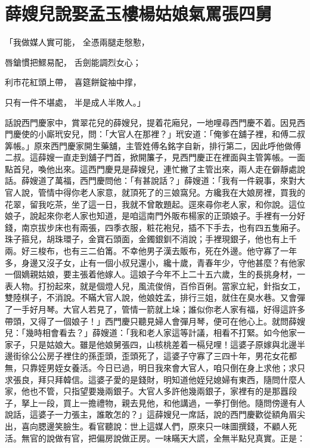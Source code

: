 %

\chapter{薛嫂兒說娶孟玉樓\KG 楊姑娘氣罵張四舅}

\begin{showcontents}{}



「我做媒人實可能，  全憑兩腿走慇懃，

唇鎗慣把鰥易配，  舌劍能調烈女心；

利市花紅頭上帶，  喜筵餅錠袖中撑，

只有一件不堪處，  半是成人半敗人。」

話說西門慶家中，賞翠花兒的薛嫂兒，提着花廂兒，一地哩尋西門慶不着。因見西門慶使的小廝玳安兒，問：「大官人在那裡？」玳安道：「俺爹在舖子裡，和傅二叔筭帳。」原來西門慶家開生藥舖，主管姓傅名銘字自新，排行第二，因此呼他做傅二叔。這薛嫂一直走到舖子門首，掀開簾子，見西門慶正在裡面與主管筭帳。一面點首兒，喚他出來。這西門慶見是薛嫂兒，連忙撇了主管出來，兩人走在僻靜處說話。薛嫂道了萬福，西門慶問他：「有甚說話？」薛嫂道：「我有一件親事，來對大官人說，管情中得你老人家意，就頂死了的三娘窩兒。方纔我在大娘房裡，買我的花翠，留我吃茶，坐了這一日，我就不曾敢題起。逕來尋你老人家，和你說。這位娘子，說起來你老人家也知道，是咱這南門外販布楊家的正頭娘子。手裡有一分好錢，南京拔步床也有兩張，四季衣服，粧花袍兒，插不下手去，也有四五隻廂子。珠子箍兒，胡珠環子，金寶石頭面，金鐲銀釧不消說；手裡現銀子，他也有上千兩。好三梭布，也有三二伯筩。不幸他男子漢去販布，死在外邊。他守寡了一年多，身邊又沒子女，止有一個小叔兒還小，纔十歲，青春年少，守他甚麼？有他家一個嫡親姑娘，要主張着他嫁人。這娘子今年不上二十五六歲，生的長挑身材，一表人物。打扮起來，就是個燈人兒，風流俊俏，百伶百俐。當家立紀，針指女工，雙陸棋子，不消說。不瞞大官人說，他娘姓孟，排行三姐，就住在臭水巷。又會彈了一手好月琴。大官人若見了，管情一箭就上垛；誰似你老人家有福，好得這許多帶頭，又得了一個娘子！」西門慶只聽見婦人會彈月琴，便可在他心上。就問薛嫂兒：「幾時相會看去？」薛嫂道：「我和老人家這等計議，相看不打緊。如今他家一家子，只是姑娘大。雖是他娘舅張四，山核桃差着一槅兒哩！這婆子原嫁與北邊半邊街徐公公房子裡住的孫歪頭，歪頭死了，這婆子守寡了三四十年，男花女花都無，只靠姪男姪女養活。今日已過，明日我來會大官人，咱只倒在身上求他；求只求張良，拜只拜韓信。這婆子愛的是錢財，明知道他姪兒媳婦有東西，隨問什麼人家，他也不管，只指望要幾兩銀子。大官人多許他幾兩銀子，家裡有的是那囂段子，拏上一段，買上一擔禮物，親去見他，和他講過，一拳打倒他。隨問傍邊有人說話，這婆子一力張主，誰敢怎的？」這薛嫂兒一席話，說的西門慶歡從額角眉尖出，喜向腮邊笑臉生。看官聽說：世上這媒人們，原來只一味圖撰錢，不顧人死活。無官的說做有官，把偏房說做正房。一味瞞天大謊，全無半點兒真實。正是：


\end{showcontents}

